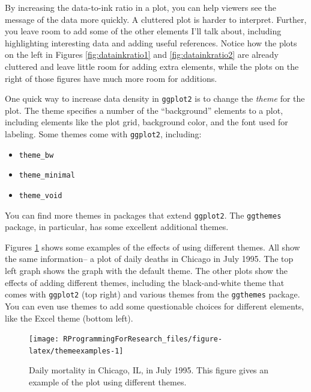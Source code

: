 \documentclass[]{book}
\providecommand{\tightlist}{%
  \setlength{\itemsep}{0pt}\setlength{\parskip}{0pt}}
\begin{document}
By increasing the data-to-ink ratio in a plot, you can help viewers see
the message of the data more quickly. A cluttered plot is harder to
interpret. Further, you leave room to add some of the other elements
I'll talk about, including highlighting interesting data and adding
useful references. Notice how the plots on the left in Figures
\ref{fig:datainkratio1} and \ref{fig:datainkratio2} are already
cluttered and leave little room for adding extra elements, while the
plots on the right of those figures have much more room for additions.

One quick way to increase data density in \texttt{ggplot2} is to change
the \emph{theme} for the plot. The theme specifies a number of the
``background'' elements to a plot, including elements like the plot
grid, background color, and the font used for labeling. Some themes come
with \texttt{ggplot2}, including:

\begin{itemize}
\tightlist
\item
  \texttt{theme\_bw}
\item
  \texttt{theme\_minimal}
\item
  \texttt{theme\_void}
\end{itemize}

You can find more themes in packages that extend \texttt{ggplot2}. The
\texttt{ggthemes} package, in particular, has some excellent additional
themes.

Figures \ref{fig:themeexamples} shows some examples of the effects of
using different themes. All show the same information-- a plot of daily
deaths in Chicago in July 1995. The top left graph shows the graph with
the default theme. The other plots show the effects of adding different
themes, including the black-and-white theme that comes with
\texttt{ggplot2} (top right) and various themes from the
\texttt{ggthemes} package. You can even use themes to add some
questionable choices for different elements, like the Excel theme
(bottom left).

\begin{figure}

{\centering \texttt{[image: RProgrammingForResearch\_files/figure-latex/themeexamples-1]} 

}

\caption{Daily mortality in Chicago, IL, in July 1995. This figure gives an example of the plot using different themes.}\label{fig:themeexamples}
\end{figure}
\end{document}
